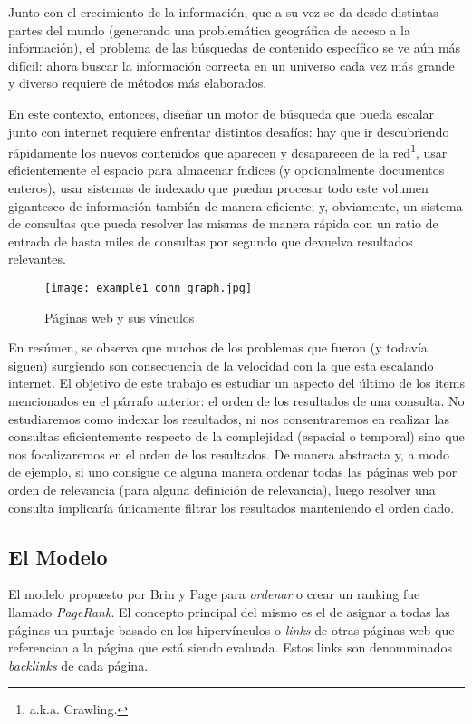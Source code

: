\par Junto con el crecimiento de la informaci\'on, que a su vez se da desde
distintas partes del mundo (generando una problem\'atica geogr\'afica de acceso
a la informaci\'on), el problema de las b\'usquedas de contenido espec\'ifico se
ve a\'un m\'as dif\'icil: ahora buscar la informaci\'on correcta en un universo
cada vez m\'as grande y diverso requiere de m\'etodos m\'as elaborados.

\par En este contexto, entonces, dise\~nar un motor de b\'usqueda que pueda
escalar junto con internet requiere enfrentar distintos desaf\'ios: hay que ir
descubriendo r\'apidamente los nuevos contenidos que aparecen y desaparecen de
la red\footnote{a.k.a. Crawling.}, usar eficientemente el espacio para almacenar
\'indices (y opcionalmente documentos enteros), usar sistemas de indexado que puedan
procesar todo este volumen gigantesco de informaci\'on tambi\'en de manera
eficiente; y, obviamente, un sistema de consultas que pueda resolver las mismas
de manera r\'apida con un ratio de entrada de hasta miles de consultas por
segundo que devuelva resultados relevantes.

\begin{wrapfigure}[22]{r}{0.5\textwidth}
    \texttt{[image: example1\_conn\_graph.jpg]}
    \caption{P\'aginas web y sus v\'inculos~\cite{uchicago_research}}
\end{wrapfigure}
\noindent

\par En res\'umen, se observa que muchos de los problemas que fueron (y todav\'ia
siguen) surgiendo son consecuencia de la velocidad con la que esta escalando
internet. El objetivo de este trabajo es estudiar un aspecto del \'ultimo de los
items mencionados en el p\'arrafo anterior: el orden de los resultados de una
consulta. No estudiaremos como indexar los resultados, ni nos consentraremos en
realizar las consultas eficientemente respecto de la complejidad (espacial o
temporal) sino que nos focalizaremos en el orden de los resultados. De manera
abstracta y, a modo de ejemplo, si uno consigue de alguna manera ordenar todas
las p\'aginas web por orden de relevancia (para alguna definici\'on de relevancia),
luego resolver una consulta implicar\'ia \'unicamente filtrar los resultados
manteniendo el orden dado.

\subsection{El Modelo}\label{subsec:intro_pagerank}
\par El modelo propuesto por Brin y Page para \emph{ordenar} o crear un ranking
fue llamado \emph{PageRank}. El concepto principal del mismo es el de asignar a
todas las p\'aginas un puntaje basado en los hiperv\'inculos o \emph{links} de
otras p\'aginas web que referencian a la p\'agina que está siendo evaluada. Estos links
son denomminados \emph{backlinks} de cada p\'agina.

